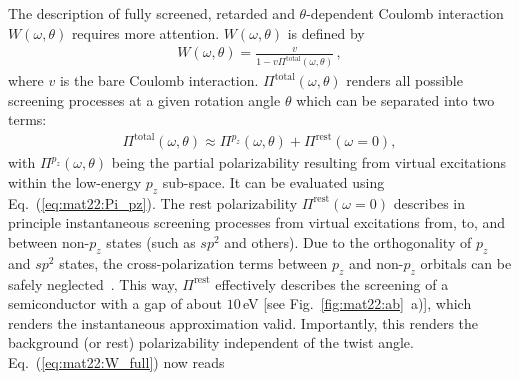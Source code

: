 \vspace{-0.2cm}The description of fully screened, retarded and $\theta$-dependent Coulomb interaction $W(\omega, \theta)$ requires more attention. $W(\omega, \theta)$ is defined by
\vspace{-0.1cm}\begin{align}\label{eq:mat22:W_full}
    W(\omega, \theta) = \frac{v}{1 - v \Pi^\text{total}(\omega, \theta)} \,,
\end{align}
where $v$ is the bare Coulomb interaction. $\Pi^\text{total}(\omega, \theta)$ renders all possible screening processes at a given rotation angle $\theta$ which can be separated into two terms:
\vspace{-0.1cm}\begin{align*}
     \Pi^\text{total}(\omega, \theta) \approx 
         \Pi^{p_z}(\omega, \theta) + \Pi^\text{rest}(\omega = 0),
\end{align*}
with $\Pi^{p_z}(\omega, \theta)$ being the partial polarizability resulting from virtual excitations within the low-energy $p_z$ sub-space. It can be evaluated using Eq.~(\ref{eq:mat22:Pi_pz}). The rest polarizability $\Pi^\text{rest}(\omega = 0)$ describes in principle instantaneous screening processes from virtual excitations from, to, and between non-$p_z$ states (such as $sp^2$ and others). Due to the orthogonality of $p_z$ and $sp^2$ states, the cross-polarization terms between $p_z$ and non-$p_z$ orbitals can be safely neglected~\cite{van_loon_random_2021}. This way, $\Pi^\text{rest}$ effectively describes the screening of a semiconductor with a gap of about $10\,$eV [see Fig.~\ref{fig:mat22:ab}~a)], which renders the  instantaneous approximation valid. Importantly, this renders the background (or rest) polarizability independent of the twist angle. Eq.~(\ref{eq:mat22:W_full}) now reads

